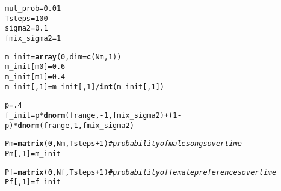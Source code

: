 \documentclass{article}\usepackage[]{graphicx}\usepackage[]{color}
\makeatletter
\newcommand{\hlnum}[1]{\textcolor[rgb]{0.686,0.059,0.569}{#1}}%
\newcommand{\hlcom}[1]{\textcolor[rgb]{0.678,0.584,0.686}{\textit{#1}}}%
\newcommand{\hlopt}[1]{\textcolor[rgb]{0,0,0}{#1}}%
\newcommand{\hlstd}[1]{\textcolor[rgb]{0.345,0.345,0.345}{#1}}%
\newcommand{\hlkwb}[1]{\textcolor[rgb]{0.69,0.353,0.396}{#1}}%
\newcommand{\hlkwc}[1]{\textcolor[rgb]{0.333,0.667,0.333}{#1}}%
\newcommand{\hlkwd}[1]{\textcolor[rgb]{0.737,0.353,0.396}{\textbf{#1}}}%
\newenvironment{kframe}{%
 \def\at@end@of@kframe{}%
 \ifinner\ifhmode%
  \def\at@end@of@kframe{\end{minipage}}%
  \begin{minipage}{\columnwidth}%
 \fi\fi%
 \def\FrameCommand##1{\hskip\@totalleftmargin \hskip-\fboxsep
 \colorbox{shadecolor}{##1}\hskip-\fboxsep
     \hskip-\linewidth \hskip-\@totalleftmargin \hskip\columnwidth}%
 \MakeFramed {\advance\hsize-\width
   \@totalleftmargin\z@ \linewidth\hsize
   \@setminipage}}%
 {\par\unskip\endMakeFramed%
 \at@end@of@kframe}
\newenvironment{knitrout}{}{} %
\makeatother
\begin{document}
\begin{knitrout}
\color{fgcolor}\begin{kframe}
\begin{alltt}
\hlstd{mut_prob} \hlkwb{=} \hlnum{0.01}
\hlstd{Tsteps} \hlkwb{=} \hlnum{100}
\hlstd{sigma2} \hlkwb{=} \hlnum{0.1}
\hlstd{fmix_sigma2} \hlkwb{=} \hlnum{1}

\hlstd{m_init} \hlkwb{=} \hlkwd{array}\hlstd{(}\hlnum{0}\hlstd{,} \hlkwc{dim} \hlstd{=} \hlkwd{c}\hlstd{(Nm,}\hlnum{1}\hlstd{))}
\hlstd{m_init[m0]} \hlkwb{=} \hlnum{0.6}
\hlstd{m_init[m1]} \hlkwb{=} \hlnum{0.4}
\hlstd{m_init[,}\hlnum{1}\hlstd{]} \hlkwb{=} \hlstd{m_init[,}\hlnum{1}\hlstd{]}\hlopt{/}\hlkwd{int}\hlstd{(m_init[,}\hlnum{1}\hlstd{])}

\hlstd{p} \hlkwb{=} \hlnum{.4}
\hlstd{f_init} \hlkwb{=} \hlstd{p}\hlopt{*}\hlkwd{dnorm}\hlstd{(frange,}\hlopt{-}\hlnum{1}\hlstd{,fmix_sigma2)}\hlopt{+}\hlstd{(}\hlnum{1}\hlopt{-}\hlstd{p)}\hlopt{*}\hlkwd{dnorm}\hlstd{(frange,}\hlnum{1}\hlstd{,fmix_sigma2)}

\hlstd{Pm} \hlkwb{=} \hlkwd{matrix}\hlstd{(}\hlnum{0}\hlstd{,Nm,Tsteps}\hlopt{+}\hlnum{1}\hlstd{)} \hlcom{#probability of male songs over time}
\hlstd{Pm[,}\hlnum{1}\hlstd{]} \hlkwb{=} \hlstd{m_init}

\hlstd{Pf} \hlkwb{=} \hlkwd{matrix}\hlstd{(}\hlnum{0}\hlstd{,Nf,Tsteps}\hlopt{+}\hlnum{1}\hlstd{)} \hlcom{#probability of female preferences over time}
\hlstd{Pf[,}\hlnum{1}\hlstd{]} \hlkwb{=} \hlstd{f_init}


\end{alltt}
\end{kframe}
\end{knitrout}
\end{document}
